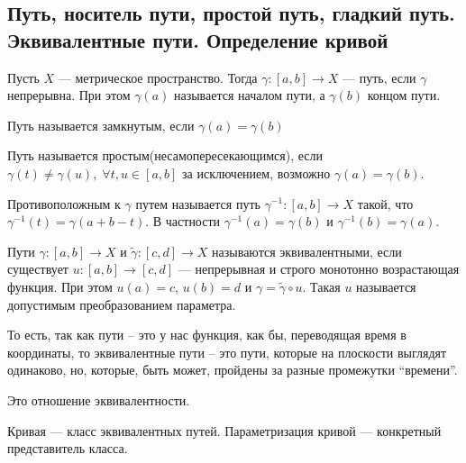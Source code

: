 \subsection{Путь, носитель пути, простой путь, гладкий путь. Эквивалентные пути. Определение кривой}

\begin{conj}
    Пусть $X$ --- метрическое пространство. Тогда
    $\gamma\colon [a, b] \to X$ --- путь, если $\gamma$ непрерывна. При этом $\gamma(a)$ называется началом пути, а $\gamma(b)$ концом пути.
  \end{conj}
  
  \begin{conj}
    Путь называется замкнутым, если $\gamma(a) = \gamma(b)$
  \end{conj}
  
  \begin{conj}
    Путь называется простым(несамопересекающимся), если  $\gamma(t) \neq \gamma(u),\; \forall t, u \in [a, b]$ за исключением, возможно $\gamma(a) = \gamma(b)$.
  \end{conj}
  
  \begin{conj}
    Противоположным к $\gamma$ путем называется путь $\gamma^{-1}\colon [a, b] \to X$ такой, что $\gamma^{-1}(t) = \gamma(a + b - t)$. В частности $\gamma^{-1}(a) = \gamma(b)$ и $\gamma^{-1}(b) = \gamma(a)$.
  \end{conj}
  
  \begin{conj}
    Пути $\gamma\colon[a, b] \to X$ и $\widetilde{\gamma}\colon[c, d] \to X$ называются эквивалентными, если существует $u\colon [a, b] \to [c, d]$ --- непрерывная и строго монотонно возрастающая функция. При этом $u(a) = c,\, u(b) = d$ и $\gamma = \widetilde{\gamma} \circ u$.
    Такая $u$ называется допустимым преобразованием параметра.
  \end{conj}

  То есть, так как пути -- это у нас функция, как бы, переводящая время в координаты, то эквивалентные пути -- это пути, которые на плоскости выглядят
  одинаково, но, которые, быть может, пройдены за разные промежутки ``времени''.

  \begin{notice}
    Это отношение эквивалентности.
  \end{notice}
  
  \begin{conj}
    Кривая --- класс эквивалентных путей. Параметризация кривой --- конкретный представитель класса.
  \end{conj}
  
